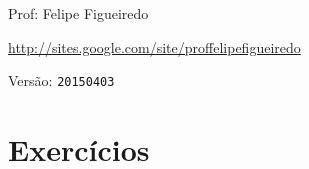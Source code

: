 \documentclass[a4paper]{article}
\begin{document}
\parbox[c]{.825\textwidth}{\raggedright%
{Prof: Felipe Figueiredo\par}
{\url{http://sites.google.com/site/proffelipefigueiredo}\par}
}

Versão: \verb|20150403|




\section{Exercícios}
\end{document}

